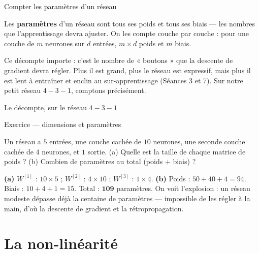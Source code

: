 \documentclass[aspectratio=169,11pt]{beamer}
\begin{document}
\begin{frame}{Compter les paramètres d'un réseau}
\begin{ucaddef}
{\small Les \textbf{paramètres} d'un réseau sont tous ses poids et tous ses biais — les nombres que l'apprentissage devra ajuster. On les compte couche par couche : pour une couche de $m$ neurones sur $d$ entrées, $m \times d$ poids et $m$ biais.}
\end{ucaddef}
{\small Ce décompte importe : c'est le nombre de « boutons » que la descente de gradient devra régler. Plus il est grand, plus le réseau est expressif, mais plus il est lent à entraîner et enclin au sur-apprentissage (Séances 3 et 7). Sur notre petit réseau $4\!-\!3\!-\!1$, comptons précisément.}
\end{frame}

\begin{frame}{Le décompte, sur le réseau $4\!-\!3\!-\!1$}
\end{frame}

\begin{frame}{Exercice — dimensions et paramètres}
\begin{ucadrec}[Énoncé]
{\small Un réseau a $5$ entrées, une couche cachée de $10$ neurones, une seconde couche cachée de $4$ neurones, et $1$ sortie. (a) Quelle est la taille de chaque matrice de poids ? (b) Combien de paramètres au total (poids $+$ biais) ?}
\end{ucadrec}
\pause
\begin{ucadex}[Correction]
{\small \textbf{(a)} $W^{[1]}$ : $10 \times 5$ ; $W^{[2]}$ : $4 \times 10$ ; $W^{[3]}$ : $1 \times 4$. \textbf{(b)} Poids : $50 + 40 + 4 = 94$. Biais : $10 + 4 + 1 = 15$. Total : $\mathbf{109}$ paramètres. On voit l'explosion : un réseau modeste dépasse déjà la centaine de paramètres — impossible de les régler à la main, d'où la descente de gradient et la rétropropagation.}
\end{ucadex}
\end{frame}

\section{La non-linéarité}
\end{document}
